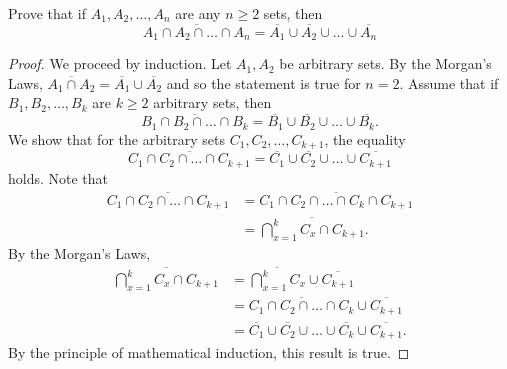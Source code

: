 \documentclass[12pt]{article}
\newenvironment{problem}[2][Problem]{\begin{trivlist}
		\item[\hskip \labelsep {\bfseries #1}\hskip \labelsep {\bfseries #2.}]}{\end{trivlist}}
\begin{document}
\begin{problem}{29}
	Prove that if $A_{1}, A_{2}, \ldots, A_{n}$ are any $n\geq 2$ sets, then
	\begin{equation*}
		\overline{A_{1}\cap A_{2}\cap \ldots \cap A_{n}} = \overline{A_{1}}\cup \overline{A_{2}}\cup \ldots \cup \overline{A_{n}}
	\end{equation*}
	\begin{proof}
		We proceed by induction. Let $A_{1},A_{2}$ be arbitrary sets. By the Morgan's Laws, $\overline{A_{1}\cap A_{2}} = \overline{A_{1}}\cup \overline{A_{2}}$ and so the statement is true for $n=2$. Assume that if $B_{1}, B_{2}, \ldots, B_{k}$ are $k\geq 2$ arbitrary sets, then 
		\begin{equation*}
			\overline{B_{1}\cap B_{2}\cap \ldots \cap B_{k}} = \overline{B_{1}}\cup \overline{B_{2}}\cup \ldots \cup \overline{B_{k}}.
		\end{equation*}  
		We show that for the arbitrary sets $C_{1}, C_{2}, \ldots, C_{k+1}$, the equality
			\begin{equation*}
			\overline{C_{1}\cap C_{2}\cap \ldots \cap C_{k+1}} = \overline{C_{1}}\cup \overline{C_{2}}\cup \ldots \cup \overline{C_{k+1}}
		\end{equation*} 
	holds. Note that
	\begin{align*}
		\overline{C_{1}\cap C_{2}\cap \ldots \cap C_{k+1}} &= \overline{ C_{1}\cap C_{2}\cap \ldots \cap C_{k} \cap C_{k+1}}\\
		&= \overline{\bigcap_{x=1}^{k}C_{x}\cap C_{k+1}}.
	\end{align*}
By the Morgan's Laws,
\begin{align*}
	\overline{\bigcap_{x=1}^{k}C_{x}\cap C_{k+1}} &=  \overline{\bigcap_{x=1}^{k}C_{x}}\cup \overline{C_{k+1}}\\
	&= \overline{C_{1}\cap C_{2}\cap \ldots \cap C_{k}}\cup \overline{C_{k+1}}\\
	&= \overline{C_{1}}\cup \overline{C_{2}}\cup \ldots \cup \overline{C_{k}} \cup \overline{C_{k+1}}.
\end{align*}
By the principle of mathematical induction, this result is true.
	\end{proof}
\end{problem}
\end{document}
